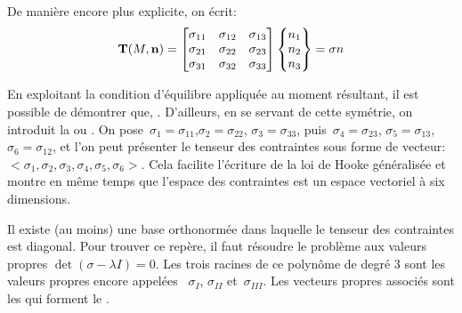 \medskipvm
De manière encore plus explicite, on écrit:
\begin{equation}
\vect{T}(M,\vect{n}) =
\MM*{\sigma_{11}&\sigma_{12}&\sigma_{13}\\ \sigma_{21}&\sigma_{22}&\sigma_{23}\\
\sigma_{31}&\sigma_{32}&\sigma_{33}}
\VV*{n_1\\n_2\\n_3}
= \sigma n
\end{equation}


\medskip
En exploitant la condition d'équilibre appliquée au moment résultant, il est possible de démontrer que,
.
\medskipvm
{} D'ailleurs, en se servant de cette symétrie, on introduit la 
ou .
On pose~$\sigma_1=\sigma_{11}$,$\sigma_2=\sigma_{22}$, $\sigma_3=\sigma_{33}$,
puis~$\sigma_4=\sigma_{23}$, $\sigma_5=\sigma_{13}$, $\sigma_6=\sigma_{12}$,
et l'on peut présenter le tenseur des contraintes sous forme de vecteur:
$<\sigma_1, \sigma_2, \sigma_3, \sigma_4, \sigma_5, \sigma_6>$.
Cela facilite l'écriture de la loi de Hooke généralisée et montre en même temps
que l'espace des contraintes est un espace vectoriel à six dimensions.

\medskip
Il existe (au moins) une base orthonormée dans laquelle le tenseur des contraintes est diagonal.
Pour trouver ce repère, il faut résoudre le problème aux valeurs propres
$\det(\sigma-\lambda I)=0$. Les trois racines de ce polynôme de degré 3 sont les
valeurs propres encore appelées ~$\sigma_I$,
$\sigma_{II}$ et~$\sigma_{III}$. Les vecteurs propres associés sont les  qui forment le .

